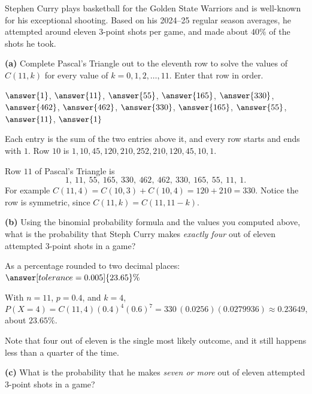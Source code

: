 \documentclass[12pt]{ximera}
\begin{document}
\begin{problem}
Stephen Curry plays basketball for the Golden State Warriors and is well-known for
his exceptional shooting. Based on his 2024--25 regular season averages, he attempted
around eleven 3-point shots per game, and made about $40\%$ of the shots he took.

\begin{prompt}
\textbf{(a)} Complete Pascal's Triangle out to the eleventh row to solve the values
of $C(11,k)$ for every value of $k=0,1,2,\ldots,11$. Enter that row in order.

$\answer{1}$, $\answer{11}$, $\answer{55}$, $\answer{165}$, $\answer{330}$,
$\answer{462}$, $\answer{462}$, $\answer{330}$, $\answer{165}$, $\answer{55}$,
$\answer{11}$, $\answer{1}$

\begin{hint}
Each entry is the sum of the two entries above it, and every row starts and ends with
$1$. Row $10$ is $1, 10, 45, 120, 210, 252, 210, 120, 45, 10, 1$.
\end{hint}

\begin{feedback}
Row $11$ of Pascal's Triangle is
\[
1,\ 11,\ 55,\ 165,\ 330,\ 462,\ 462,\ 330,\ 165,\ 55,\ 11,\ 1.
\]
For example $C(11,4)=C(10,3)+C(10,4)=120+210=330$. Notice the row is symmetric,
since $C(11,k)=C(11,11-k)$.
\end{feedback}
\end{prompt}

\begin{prompt}
\textbf{(b)} Using the binomial probability formula and the values you computed
above, what is the probability that Steph Curry makes \emph{exactly four} out of
eleven attempted 3-point shots in a game?

As a percentage rounded to two decimal places: $\answer[tolerance=0.005]{23.65}\%$

\begin{feedback}
With $n=11$, $p=0.4$, and $k=4$,
\[
P(X=4)=C(11,4)(0.4)^4(0.6)^7 = 330\,(0.0256)(0.0279936)\approx 0.23649,
\]
about $23.65\%$.

Note that four out of eleven is the single most likely outcome, and it still happens
less than a quarter of the time.
\end{feedback}
\end{prompt}

\begin{prompt}
\textbf{(c)} What is the probability that he makes \emph{seven or more} out of eleven
attempted 3-point shots in a game?


\end{prompt}
\end{problem}
\end{document}

